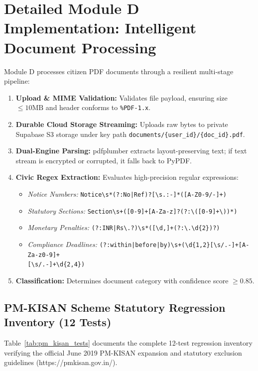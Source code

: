\section{Detailed Module D Implementation: Intelligent Document Processing}
\label{sec:module_d_impl}
Module D processes citizen PDF documents through a resilient multi-stage pipeline:
\begin{enumerate}
    \item \textbf{Upload \& MIME Validation:} Validates file payload, ensuring size $\le 10\text{MB}$ and header conforms to \texttt{\%PDF-1.x}.
    \item \textbf{Durable Cloud Storage Streaming:} Uploads raw bytes to private Supabase S3 storage under key path \texttt{documents/\{user\_id\}/\{doc\_id\}.pdf}.
    \item \textbf{Dual-Engine Parsing:} pdfplumber extracts layout-preserving text; if text stream is encrypted or corrupted, it falls back to PyPDF.
    \item \textbf{Civic Regex Extraction:} Evaluates high-precision regular expressions:
    \begin{itemize}
        \item \textit{Notice Numbers:} \texttt{Notice\textbackslash s*(?:No|Ref)?[\textbackslash s.:-]*([A-Z0-9/-]+)}
        \item \textit{Statutory Sections:} \texttt{Section\textbackslash s+([0-9]+[A-Za-z]?(?:\textbackslash ([0-9]+\textbackslash ))*)}
        \item \textit{Monetary Penalties:} \texttt{(?:INR|Rs\textbackslash .?)\textbackslash s*([\textbackslash d,]+(?:\textbackslash .\textbackslash d\{2\})?)}
        \item \textit{Compliance Deadlines:} \texttt{(?:within|before|by)\textbackslash s+(\textbackslash d\{1,2\}[\textbackslash s/.-]+[A-Za-z0-9]+} \\
        \hspace*{1.5cm} \texttt{[\textbackslash s/.-]+\textbackslash d\{2,4\})}
    \end{itemize}
    \item \textbf{Classification:} Determines document category with confidence score $\ge 0.85$.
\end{enumerate}


\subsection{PM-KISAN Scheme Statutory Regression Inventory (12 Tests)}
\label{sec:pm_kisan_tests}
Table~\ref{tab:pm_kisan_tests} documents the complete 12-test regression inventory verifying the official June 2019 PM-KISAN expansion and statutory exclusion guidelines (https://pmkisan.gov.in/).

